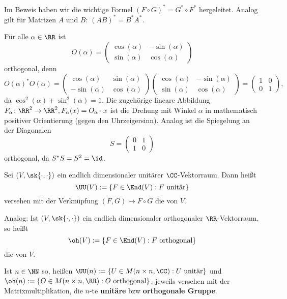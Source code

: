 \begin{bemerkung}
	\label{bem:6.3}
	Im Beweis haben wir die wichtige Formel $(F \circ G)^* = G^* \circ F^*$ hergeleitet.
	Analog gilt für Matrizen $A$ und $B$: $(AB)^* = B^* A^*$.
\end{bemerkung}

\begin{beispiel}
	\label{bsp:6.4}
	Für alle $\alpha \in \RR$ ist
	\[
		O(\alpha) = \begin{pmatrix}
			\cos(\alpha) & -\sin(\alpha) \\
			\sin(\alpha) & \cos(\alpha)
		\end{pmatrix}
	\]
	orthogonal, denn
	\[
		O(\alpha)^* O(\alpha) = \begin{pmatrix}
			\cos(\alpha)  & \sin(\alpha) \\
			-\sin(\alpha) & \cos(\alpha)
		\end{pmatrix} \begin{pmatrix}
		\cos(\alpha) & -\sin(\alpha) \\
		\sin(\alpha) & \cos(\alpha)
		\end{pmatrix} = \begin{pmatrix}
			1 & 0 \\
			0 & 1
		\end{pmatrix},
	\]
	da $\cos^2(\alpha) + \sin^2(\alpha) = 1$.
	Die zugehörige lineare Abbildung $F_\alpha \colon \RR^2 \rightarrow \RR^2, F_\alpha(x) = O_\alpha \cdot x$ ist die Drehung mit Winkel $\alpha$ in mathematisch positiver Orientierung (gegen den Uhrzeigersinn).
	Analog ist die Spiegelung an der Diagonalen
	\[
		S = \begin{pmatrix}
		 0 & 1 \\
		 1 & 0
		\end{pmatrix}
	\]
	orthogonal, da $S^*S = S^2 = \id$.
\end{beispiel}

\begin{definition}
	\label{def:6.5}
	Sei $(V,\sk{\cdot,\cdot})$ ein endlich dimensionaler unitärer $\CC$-Vektorraum.
	Dann heißt
	\[
		\UU(V) := \{F \in \End(V) : F \text{ unitär}\}
	\]
	versehen mit der Verknüpfung $(F,G) \mapsto F \circ G$ die  von $V$.
	
	Analog: Ist $(V,\sk{\cdot,\cdot})$ ein endlich dimensionaler orthogonaler $\RR$-Vektorraum, so heißt
	\[
		\oh(V) := \{F \in \End(V) : F \text{ orthogonal}\}
	\]
	die  von $V$.
	
	Ist $n \in \NN$ so, heißen $\UU(n) := \{U \in M(n\times n,\CC) : U \text{ unitär}\}$ und $\oh(n) := \{O \in M(n \times n,\RR) : O \text{ orthogonal}\}$, jeweils versehen mit der Matrixmultiplikation, die $n$-te \textbf{unitäre} bzw \textbf{orthogonale Gruppe}.
\end{definition}

